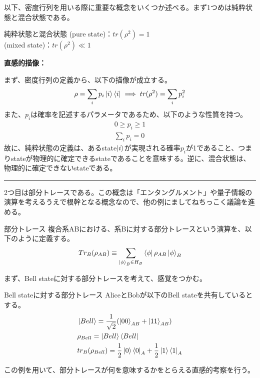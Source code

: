\documentclass[a4paper,10.5pt]{article}
\numberwithin{equation}{section}
\newenvironment{intuitionbox}
{\begin{prooflabel}\textbf{直感的描像：}\end{prooflabel}\vspace{0.8em}}
{\par\vspace{1em}\hrule\vspace{1em}}
\begin{document}
以下、密度行列を用いる際に重要な概念をいくつか述べる。まず1つめは純粋状態と混合状態である。
\begin{defbox}{純粋状態と混合状態}
(pure state)：$tr(\rho^{2})=1$\\
(mixed state)：$tr(\rho^{2})\ll 1$
\end{defbox}
\begin{intuitionbox}
まず、密度行列の定義から、以下の描像が成立する。
\begin{align*}
\rho=\sum_{i}p_{i}\ket{i}\bra{i}\implies tr(\rho^{2})=\sum_{i}p_{i}^{2}
\end{align*}
また、$p_{i}$は確率を記述するパラメータであるため、以下のような性質を持つ。
\begin{align*}
0\geq p_{i} \geq 1\\
\sum_{i}p_{i}=0
\end{align*}
故に、純粋状態の定義は、あるstate$\ket{i}$が実現される確率$p_{i}$が1であること、つまりstateが物理的に確定できるstateであることを意味する。逆に、混合状態は、物理的に確定できないstateである。
\end{intuitionbox}
2つ目は部分トレースである。この概念は「エンタングルメント」や量子情報の演算を考えるうえで根幹となる概念なので、他の例にましてねちっこく議論を進める。
\begin{defbox}{部分トレース}
複合系ABにおける、系Bに対する部分トレースという演算を、以下のように定義する。
\begin{align*}
Tr_{B}(\rho_{AB})\equiv\sum_{\ket{\phi}_{B}\in H_{B}}\bra{\phi}\rho_{AB}\ket{\phi}_{B}
\end{align*}
\end{defbox}
まず、Bell stateに対する部分トレースを考えて、感覚をつかむ。
\begin{examplebox}{Bell stateに対する部分トレース}
AliceとBobが以下のBell stateを共有しているとする。
\begin{align}
&\ket{Bell}=\frac{1}{\sqrt{2}}(\ket{00}_{AB}+\ket{11}_{AB})\\
&\rho_{Bell}=\ket{Bell}\bra{Bell}\\
&tr_{B}(\rho_{Bell})=\frac{1}{2}\ket{0}\bra{0}_{A}+\frac{1}{2}\ket{1}\bra{1}_{A}
\end{align}
\end{examplebox}
この例を用いて、部分トレースが何を意味するかをとらえる直感的考察を行う。
\end{document}
